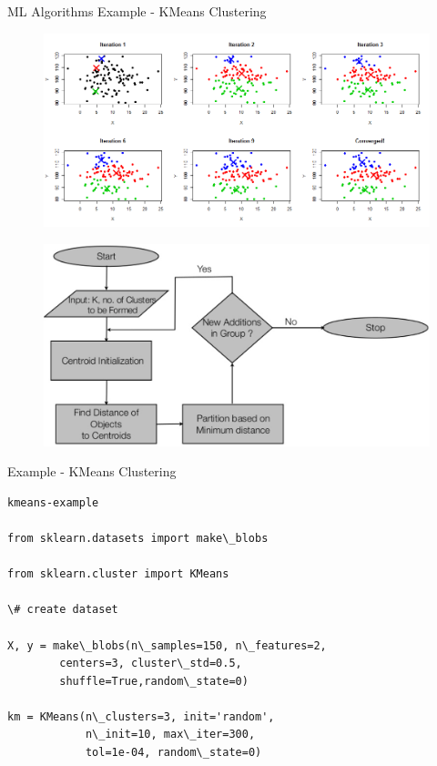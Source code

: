 \documentclass{beamer}
\begin{document}
\begin{frame}[allowframebreaks]{ML Algorithms}
\framebreak
{\large Example - KMeans Clustering}
\begin{figure}
\centering
\captionsetup{justification=centering}
\includegraphics[scale=0.33]{kmeans-example.png}
\end{figure}

\framebreak
\begin{figure}
\centering
\captionsetup{justification=centering}
\includegraphics[scale=0.23]{KMeans.png}
\end{figure}

\framebreak

{\large Example - KMeans Clustering}
\begin{lstlisting}
kmeans-example

from sklearn.datasets import make\_blobs

from sklearn.cluster import KMeans

\# create dataset

X, y = make\_blobs(n\_samples=150, n\_features=2,
        centers=3, cluster\_std=0.5,
        shuffle=True,random\_state=0)

km = KMeans(n\_clusters=3, init='random',
            n\_init=10, max\_iter=300,
            tol=1e-04, random\_state=0)


\end{lstlisting}
\end{frame}
\end{document}
